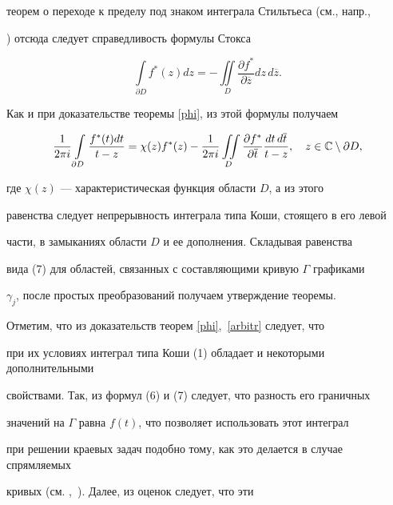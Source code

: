 \begin{pf}
теорем о переходе к пределу под знаком интеграла Стильтьеса (см., напр.,


\cite{R}) отсюда следует справедливость формулы Стокса


$$


\int\limits_{\partial D}f^{*}(z)dz = -\iint\limits_{D}


\frac{\partial f^*}{\partial\overline z}dz\,d\overline z.


$$


Как и при доказательстве теоремы \ref{phi}, из этой формулы получаем


\begin{equation}


\frac{1}{2\pi i}\int\limits_{\partial D}{\frac{f^{*}(t)dt}{t-z}} =


\chi (z)f^{*}(z) - \frac{1}{2\pi i}


\iint\limits_{D}


{\frac{\partial f^{*}}{\partial\overline{t}}\frac{dt\,d\overline{t}}{t-z}},


\quad z\in{\Bbb C}\setminus\partial D,


\end{equation}


где $\chi (z)$ --- характеристическая функция области $D$, а из этого


равенства следует непрерывность интеграла типа Коши, стоящего в его левой


части, в замыканиях области $D$ и ее дополнения. Складывая равенства


вида (7) для областей, связанных с составляющими кривую $\Gamma$ графиками


$\gamma_j$, после простых преобразований получаем утверждение теоремы.


\end{pf}





Отметим, что из доказательств теорем \ref{phi},~\ref{arbitr} следует, что


при их условиях интеграл типа Коши (1) обладает и некоторыми дополнительными


свойствами. Так, из формул (6) и (7) следует, что разность его граничных


значений на $\Gamma$ равна $f(t)$, что позволяет использовать этот интеграл


при решении краевых задач подобно тому, как это делается в случае спрямляемых


кривых (см. \cite{Ga},~\cite{Mu}). Далее, из оценок \cite{V} следует, что эти


